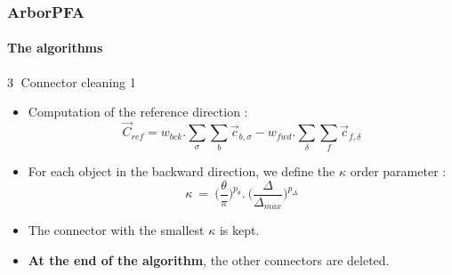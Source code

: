 \documentclass[8pt]{beamer}
\begin{document}
  
  \begin{frame}
  \frametitle{ArborPFA}
  \framesubtitle{The algorithms}
    \begin{minipage}{0.55\linewidth}
      \begin{block}{\textcircled{{\small 3}} Connector cleaning 1}
         \\
        \begin{itemize}
          \item<3-> Computation of the reference direction :
          \begin{equation}
            \vec{C}_{ref} = w_{bck} . \sum_\sigma \sum_b \vec{c}_{b,\sigma} - w_{fwd} . \sum_\delta \sum_f \vec{c}_{f,\delta}
          \end{equation}
          \item<4-> For each object in the backward direction, we define the $\kappa$ order parameter :
          \begin{equation}
            \kappa~=~\Big(\frac{\theta}{\pi}\Big)^{p_{\theta}} . ~\Big(\frac{\Delta}{\Delta_{max}}\Big)^{p_{\Delta}} 
          \end{equation}
          \item<5-> The connector with the smallest $\kappa$ is kept.
          \item<6-> \textbf{At the end of the algorithm}, the other connectors are deleted. \\
        \end{itemize}
      \end{block}
    \end{minipage} \hfill
    \begin{minipage}{0.3\linewidth}
      \begin{center}
      \end{center}
    \end{minipage}
  \end{frame}
  
\end{document}
